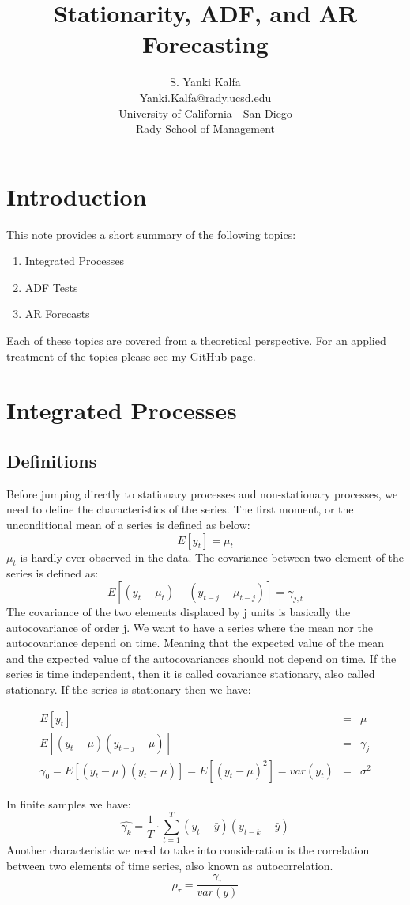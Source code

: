 \documentclass[12pt,letter]{article}
\author{S. Yanki Kalfa\\
	Yanki.Kalfa@rady.ucsd.edu\\
University of California - San Diego\\
Rady School of Management}
\title{Stationarity, ADF, and AR Forecasting}
\begin{document}
\maketitle
\section{Introduction}
This note provides a short summary of the following topics:
\begin{enumerate}
\item Integrated Processes\\
\item ADF Tests\\
\item AR Forecasts
\end{enumerate}
Each of these topics are covered from a theoretical perspective. For an applied treatment of the topics please see my \href{https://github.com/yankikalfa/MGTF-405-Business-Forecasting}{GitHub} page.

\section{Integrated Processes}

\subsection{Definitions}
Before jumping directly to stationary processes and non-stationary processes, we need to define the characteristics of the series. The first moment, or the unconditional mean of a series is defined as below:$$ E[y_{t}]=\mu_{t}$$
$\mu_{t}$ is hardly ever observed in the data. The covariance between two element of the series is defined as: $$ E[(y_{t}-\mu_{t})- (y_{t-j}-\mu_{t-j})]= \gamma_{j,t}$$
The covariance of the two elements displaced by j units is basically the autocovariance of order j. We want to have a series where the mean nor the autocovariance depend on time. Meaning that the expected value of the mean and the expected value of the autocovariances should not depend on time. If the series is time independent, then it is called covariance stationary, also called stationary. If the series is stationary then we have:
\begin{center}
\begin{framed}
\begin{eqnarray}
E[y_{t}]&=&\mu\\
E[(y_{t}-\mu)(y_{t-j}-\mu)]&=&\gamma_{j}\\
\gamma_{0}=E[(y_{t}-\mu)(y_{t}-\mu)]=E[(y_{t}-\mu)^{2}]=var(y_{t})&=&\sigma^{2}
\end{eqnarray}	
\end{framed} 
\end{center}
In finite samples we have:
\begin{equation*}
\hat{\gamma_{k}}= \frac{1}{T}\cdot \sum^{T}_{t=1} (y_{t}-\bar{y})(y_{t-k}-\bar{y})
\end{equation*}
Another characteristic we need to take into consideration is the correlation between two elements of time series, also known as autocorrelation.
$$ \rho_{\tau}=\dfrac{\gamma_{\tau}}{var(y)}$$\\
	
\end{document}
